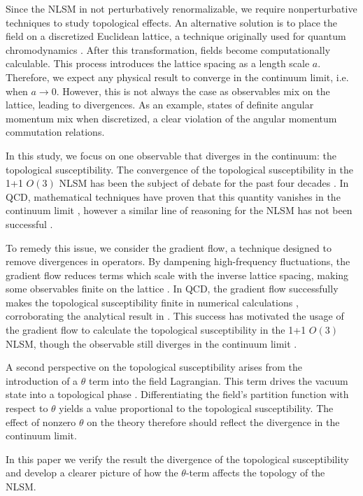 Since the NLSM in not perturbatively renormalizable, we require nonperturbative techniques to study topological effects. An alternative solution is to place the field on a discretized Euclidean lattice, a technique originally used for quantum chromodynamics \cite{wilson1974}. After this transformation, fields become computationally calculable. This process introduces the lattice spacing as a length scale $a$. 
Therefore, we expect any physical result to converge in the continuum limit, i.e. when $a\rightarrow 0$. However, this is not always the case as observables mix on the lattice, leading to divergences. As an example, states of definite angular momentum mix when discretized, a clear violation of the angular momentum commutation relations. 

In this study, we focus on one observable that diverges in the continuum: the topological susceptibility. The convergence of the topological susceptibility in the 1+1 $O(3)$ NLSM has been the subject of debate for the past four decades \cite{berg1981,bietenholz2018}. In QCD, mathematical techniques have proven that this quantity vanishes in the continuum limit \cite{giusti2004}, however a similar line of reasoning for the NLSM has not been successful \cite{bietenholz2018}.

To remedy this issue, we consider the gradient flow, a technique designed to remove divergences in operators. By dampening high-frequency fluctuations, the gradient flow reduces terms which scale with the inverse lattice spacing, making some observables finite on the lattice \cite{monahan2016}. In QCD, the gradient flow successfully makes the topological susceptibility finite in numerical calculations \cite{bruno2014}, corroborating the analytical result in \cite{giusti2004}. This success has motivated the usage of the gradient flow to calculate the topological susceptibility in the 1+1 $O(3)$ NLSM, though the observable still diverges in the continuum limit \cite{bietenholz2018}. 

A second perspective on the topological susceptibility arises from the introduction of a $\theta$ term into the field Lagrangian. This term drives the vacuum state into a topological phase \cite{alles2007}. Differentiating the field's partition function with respect to $\theta$ yields a value proportional to the topological susceptibility. The effect of nonzero $\theta$ on the theory therefore should reflect the divergence in the continuum limit.

In this paper we verify the result the divergence of the topological susceptibility and develop a clearer picture of how the $\theta$-term affects the topology of the NLSM. 


